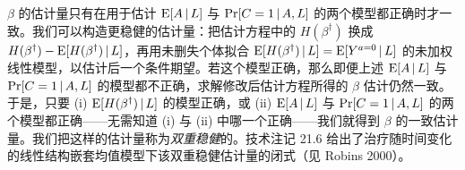 \begin{techpoint}[结构嵌套均值模型的 g 估计]
$\beta$ 的估计量只有在用于估计 $\mathrm{E}[A\,|\, L]$ 与 $\Pr[C=1\,|\, A,L]$ 的两个模型都正确时才一致。我们可以构造更稳健的估计量：把估计方程中的 $H(\beta^\dagger)$ 换成 $H(\beta^\dagger)-\mathrm{E}[H(\beta^\dagger)\,|\, L]$，再用未删失个体拟合 $\mathrm{E}[H(\beta^\dagger)\,|\, L]=\mathrm{E}[Y^{a=0}\,|\, L]$ 的未加权线性模型，以估计后一个条件期望。若这个模型正确，那么即便上述 $\mathrm{E}[A\,|\, L]$ 与 $\Pr[C=1\,|\, A,L]$ 的模型都不正确，求解修改后估计方程所得的 $\beta$ 估计仍然一致。于是，只要 (i) $\mathrm{E}[H(\beta^\dagger)\,|\, L]$ 的模型正确，或 (ii) $\mathrm{E}[A\,|\, L]$ 与 $\Pr[C=1\,|\, A,L]$ 的两个模型都正确——无需知道 (i) 与 (ii) 中哪一个正确——我们就得到 $\beta$ 的一致估计量。我们把这样的估计量称为\emph{双重稳健}的。技术注记 21.6 给出了治疗随时间变化的线性结构嵌套均值模型下该双重稳健估计量的闭式（见 Robins 2000）。
\end{techpoint}
